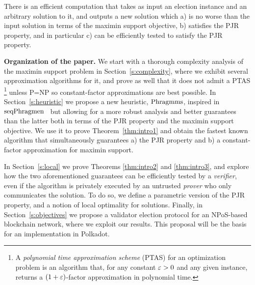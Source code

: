\begin{theorem}\label{thm:intro3}
There is an efficient computation that takes as input an election instance and an arbitrary solution to it, and outputs a new solution which a) is no worse than the input solution in terms of the maximin support objective, b) satisfies the PJR property, and in particular c) can be efficiently tested to satisfy the PJR property.
\end{theorem}

\textbf{Organization of the paper.}
We start with a thorough complexity analysis of the maximin support problem in Section~\ref{s:complexity}, 
where we exhibit several approximation algorithms for it, and prove as well that it does not admit a PTAS%
    \footnote{A \emph{polynomial time approximation scheme} (PTAS) for an optimization problem is an algorithm that, for any constant $\varepsilon>0$ and any given instance, returns a $(1+\varepsilon)$-factor approximation in polynomial time.} %
unless P=NP so constant-factor approximations are best possible.
%
In Section~\ref{s:heuristic} we propose a new heuristic, $\operatorname{Phragmms}$, inspired in $\operatorname{seqPhragmen}$~\cite{brill2017phragmen} but allowing for a more robust analysis and better guarantees than the latter both in terms of the PJR property and the maximin support objective. We use it to prove Theorem~\ref{thm:intro1} and obtain the fastest known algorithm that simultaneously guarantees a) the PJR property and b) a constant-factor approximation for maximin support.

In Section~\ref{s:local} we prove Theorems \ref{thm:intro2} and \ref{thm:intro3}, and explore how the two aforementioned guarantees can be efficiently tested by a \emph{verifier}, even if the algorithm is privately executed by an untrusted \emph{prover} who only communicates the solution. 
To do so, we define a parametric version of the PJR property, and a notion of local optimality for solutions. 
%
Finally, in Section~\ref{s:objectives} we propose a validator election protocol for an NPoS-based blockchain network, where we exploit our results. This proposal will be the basis for an implementation in Polkadot. 
